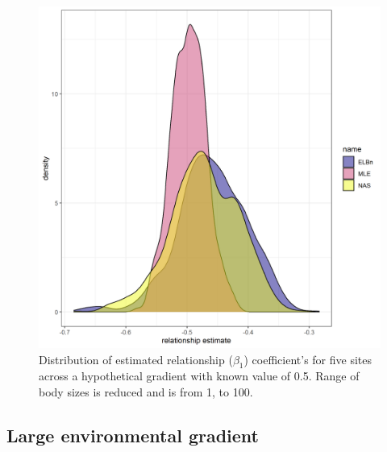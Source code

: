 \documentclass[
]{article}
\begin{document}
\begin{figure}
\centering
\includegraphics{figures/PLB_small_m_relationship_density.png}
\caption{Distribution of estimated relationship (\(\beta_1\))
coefficient's for five sites across a hypothetical gradient with known
value of 0.5. Range of body sizes is reduced and is from 1, to 100.}
\end{figure}

\hypertarget{large-environmental-gradient}{%
\subsection{Large environmental
gradient}\label{large-environmental-gradient}}
\end{document}
